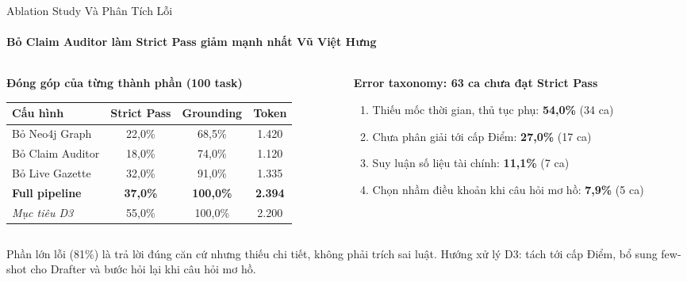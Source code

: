 \documentclass[aspectratio=1610,10pt,xcolor={table}]{beamer}
\begin{document}
\begin{frame}{Ablation Study Và Phân Tích Lỗi}
  \framesubtitle{Bỏ Claim Auditor làm Strict Pass giảm mạnh nhất \hfill Vũ Việt Hưng}

  \begin{columns}[t]
    \begin{column}{0.56\textwidth}
      \footnotesize
      \textbf{Đóng góp của từng thành phần (100 task)}\\[0.1cm]
      \begin{tabularx}{\linewidth}{@{}Xccc@{}}
        \toprule
        \textbf{Cấu hình} & \textbf{Strict Pass} & \textbf{Grounding} & \textbf{Token} \\
        \midrule
        Bỏ Neo4j Graph & 22,0\% & 68,5\% & 1.420 \\
        Bỏ Claim Auditor & 18,0\% & 74,0\% & 1.120 \\
        Bỏ Live Gazette & 32,0\% & 91,0\% & 1.335 \\
        \textbf{Full pipeline} & \textbf{37,0\%} & \textbf{100,0\%} & \textbf{2.394} \\
        \midrule
        \textit{Mục tiêu D3} & 55,0\% & 100,0\% & 2.200 \\
        \bottomrule
      \end{tabularx}
    \end{column}

    \begin{column}{0.42\textwidth}
      \begin{block}{\textbf{Error taxonomy: 63 ca chưa đạt Strict Pass}}
        \begin{enumerate}\footnotesize
          \item Thiếu mốc thời gian, thủ tục phụ: \textbf{54,0\%} (34 ca)
          \item Chưa phân giải tới cấp Điểm: \textbf{27,0\%} (17 ca)
          \item Suy luận số liệu tài chính: \textbf{11,1\%} (7 ca)
          \item Chọn nhầm điều khoản khi câu hỏi mơ hồ: \textbf{7,9\%} (5 ca)
        \end{enumerate}
      \end{block}
    \end{column}
  \end{columns}

  \vspace{0.25cm}
  \begin{tcolorbox}[colback=hcmutgray,colframe=hcmutblue!40,boxrule=0.5pt,arc=1mm]
    \footnotesize
    Phần lớn lỗi (81\%) là trả lời đúng căn cứ nhưng thiếu chi tiết, không phải trích sai luật. Hướng xử lý D3: tách tới cấp Điểm, bổ sung few-shot cho Drafter và bước hỏi lại khi câu hỏi mơ hồ.
  \end{tcolorbox}
\end{frame}
\end{document}

